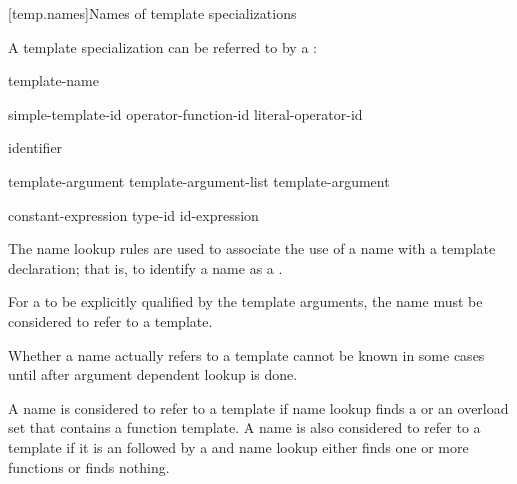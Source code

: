 [temp.names]{Names of template specializations}

\pnum
A template specialization can be referred to by a
:

\begin{bnf}
\br
  template-name \terminal{<}  \terminal{>}
\end{bnf}

\begin{bnf}
\br
  simple-template-id\br
  operator-function-id \terminal{<}  \terminal{>}\br
  literal-operator-id \terminal{<}  \terminal{>}
\end{bnf}

\begin{bnf}
\br
  identifier
\end{bnf}

\begin{bnf}
\br
  template-argument \br
  template-argument-list \terminal{,} template-argument 
\end{bnf}

\begin{bnf}
\br
  constant-expression\br
  type-id\br
  id-expression
\end{bnf}

\begin{note}
The name lookup rules are used to associate the use of
a name with a template declaration;
that is, to identify a name as a
.
\end{note}

\pnum
For a
to be explicitly qualified by the template arguments,
the name must be considered to refer to a template.
\begin{note}
Whether a name actually refers to a template
cannot be known in some cases
until after argument dependent lookup is done.
\end{note}
A name is considered to refer to a template if
name lookup finds
a 
or an overload set that contains a function template.
A name is also considered to refer to a template if
it is an 
followed by a \tcode{<}
and name lookup either finds one or more functions or finds nothing.

